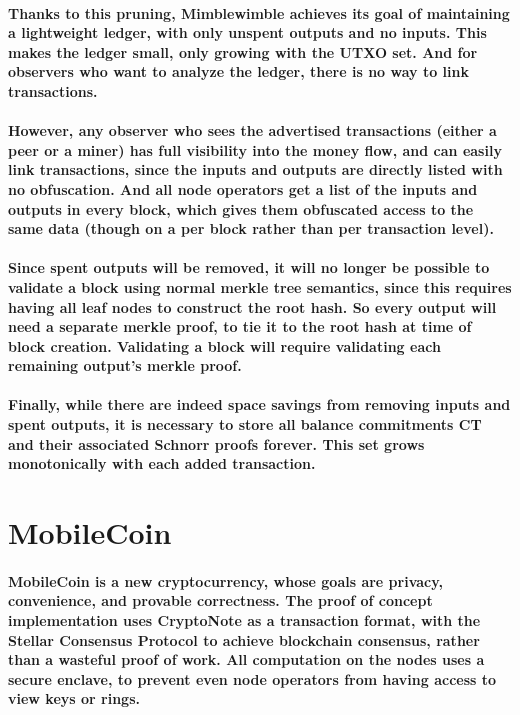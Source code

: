 \documentclass{article}
\begin{document}
\paragraph{Thanks to this pruning, Mimblewimble achieves its goal of maintaining a lightweight ledger, with only unspent outputs and no inputs.  This makes the ledger small, only growing with the UTXO set.  And for observers who want to analyze the ledger, there is no way to link transactions.}

\paragraph{However, any observer who sees the advertised transactions (either a peer or a miner) has full visibility into the money flow, and can easily link transactions, since the inputs and outputs are directly listed with no obfuscation.  And all node operators get a list of the inputs and outputs in every block, which gives them obfuscated access to the same data (though on a per block rather than per transaction level).}

\paragraph{Since spent outputs will be removed, it will no longer be possible to validate a block using normal merkle tree semantics, since this requires having all leaf nodes to construct the root hash.  So every output will need a separate merkle proof, to tie it to the root hash at time of block creation.  Validating a block will require validating each remaining output’s merkle proof.}

\paragraph{Finally, while there are indeed space savings from removing inputs and spent outputs, it is necessary to store all balance commitments CT and their associated Schnorr proofs forever.  This set grows monotonically with each added transaction.  }



\section{MobileCoin}

\paragraph{MobileCoin is a new cryptocurrency, whose goals are privacy, convenience, and provable correctness.  The proof of concept implementation uses CryptoNote as a transaction format, with the Stellar Consensus Protocol to achieve blockchain consensus, rather than a wasteful proof of work.  All computation on the nodes uses a secure enclave, to prevent even node operators from having access to view keys or rings.  }
\end{document}
